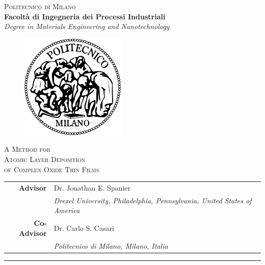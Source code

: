 \begin{titlepage}
\vspace*{-3cm}
\begin{center}
  {\LARGE
  \textsc{Politecnico di Milano}\\
  \textbf{\Large
  Facolt\`a di Ingegneria dei Processi Industriali}\\
  \emph{\large Degree in Materials Engineering and Nanotechnology}}\\
  \vspace*{0.5cm}
  \begin{figure}[htbp]
    \begin{center}
      \includegraphics[width=5cm]{./pictures/logopm.png}
    \end{center}
  \end{figure}
  \vspace{-0.3cm}
   {\huge\textsc{
  A Method for\\
  Atomic Layer Deposition\\
  of Complex Oxide Thin Films\\
  }}

  
  
\end{center}
\vspace{0.3cm} 
\large
\begin{centering}

\begin{tabular*}{0.75\textwidth}{>{\bfseries}r l}
  Advisor & Dr. Jonathan E. Spanier \\
  & \emph{\tiny Drexel University, Philadelphia, Pennsylvania, United States of America}\\
  Co-Advisor  & Dr. Carlo S. Casari \\
  & \emph{\tiny Politecnico di Milano, Milano, Italia}
  \vspace{0.3cm}
\end{tabular*}

\end{centering}
\rule{\linewidth}{0.5mm}
\begin{centering}


\end{centering}
\end{titlepage}

